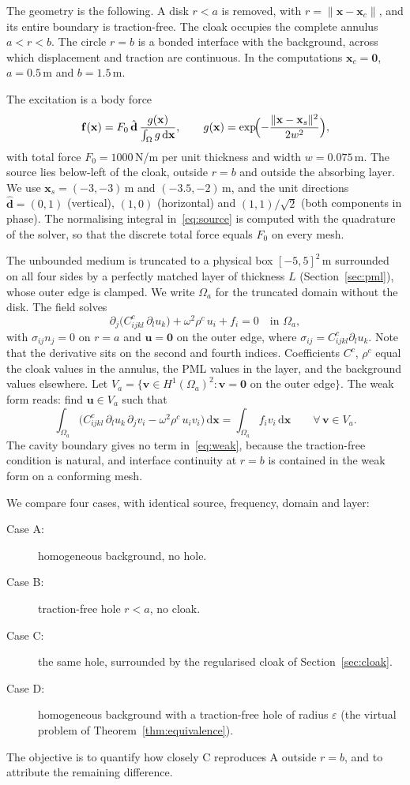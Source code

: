\documentclass[preprint,12pt]{elsarticle}
\newcommand{\mbf}[1]{\mathbf{#1}}
\newcommand{\be}{\begin{equation}}
\newcommand{\ee}{\end{equation}}
\begin{document}
The geometry is the following. A disk $r<a$ is removed, with $r=\|\mbf{x}-\mbf{x}_c\|$, and its
entire boundary is traction-free. The cloak occupies the complete annulus $a<r<b$. The circle $r=b$ is a
bonded interface with the background, across which displacement and traction are continuous. In the
computations $\mbf{x}_c=\mbf{0}$, $a=0.5$\,m and $b=1.5$\,m.

The excitation is a body force
\be\label{eq:source}
  \mbf{f}(\mbf{x})=F_0\,\hat{\mbf{d}}\,\frac{g(\mbf{x})}{\int_\Omega g\,\mathrm{d}\mbf{x}},\qquad
  g(\mbf{x})=\exp\!\Bigl(-\frac{\|\mbf{x}-\mbf{x}_s\|^2}{2w^2}\Bigr),
\ee
with total force $F_0=1000$\,N/m per unit thickness and width $w=0.075$\,m. The source lies
below-left of the cloak, outside $r=b$ and outside the absorbing layer. We use
$\mbf{x}_s=(-3,-3)$\,m and $(-3.5,-2)$\,m, and the unit directions $\hat{\mbf{d}}=(0,1)$ (vertical),
$(1,0)$ (horizontal) and $(1,1)/\sqrt{2}$ (both components in phase). The normalising integral
in~\eqref{eq:source} is computed with the quadrature of the solver, so that the discrete total force equals $F_0$ on every mesh.

The unbounded medium is truncated to a physical box $[-5,5]^2$\,m surrounded on all four sides by a
perfectly matched layer of thickness $L$ (Section~\ref{sec:pml}), whose outer edge is clamped.
We write $\Omega_a$ for the truncated domain without the disk. The field solves
\be\label{eq:strong}
  \partial_j\bigl(C^{c}_{ijkl}\,\partial_l u_k\bigr)+\omega^2\rho^{c}\,u_i+f_i=0\quad\text{in }\Omega_a,
\ee
with $\sigma_{ij}n_j=0$ on $r=a$ and $\mbf{u}=\mbf{0}$ on the outer edge, where
$\sigma_{ij}=C^{c}_{ijkl}\partial_l u_k$. Note that the derivative sits on the second and fourth indices.
Coefficients $C^c$, $\rho^c$ equal the cloak values in the annulus, the PML values in the layer,
and the background values elsewhere. Let $V_a=\{\mbf{v}\in H^1(\Omega_a)^2:\mbf{v}=\mbf{0}$ on the outer edge$\}$. The
weak form reads: find $\mbf{u}\in V_a$ such that
\be\label{eq:weak}
  \int_{\Omega_a}\!\bigl(C^{c}_{ijkl}\,\partial_l u_k\,\partial_j v_i-\omega^2\rho^{c}\,u_iv_i\bigr)\,\mathrm{d}\mbf{x}
  =\int_{\Omega_a}\! f_iv_i\,\mathrm{d}\mbf{x}\qquad\forall\,\mbf{v}\in V_a .
\ee
The cavity boundary gives no term in~\eqref{eq:weak}, because the traction-free condition is natural, and
interface continuity at $r=b$ is contained in the weak form on a conforming mesh.

We compare four cases, with identical source, frequency, domain and layer:
\begin{description}
\item[Case A:] homogeneous background, no hole.
\item[Case B:] traction-free hole $r<a$, no cloak.
\item[Case C:] the same hole, surrounded by the regularised cloak of Section~\ref{sec:cloak}.
\item[Case D:] homogeneous background with a traction-free hole of radius $\varepsilon$ (the virtual
problem of Theorem~\ref{thm:equivalence}).
\end{description}
The objective is to quantify how closely C reproduces A outside $r=b$, and to attribute the remaining difference.
\end{document}
